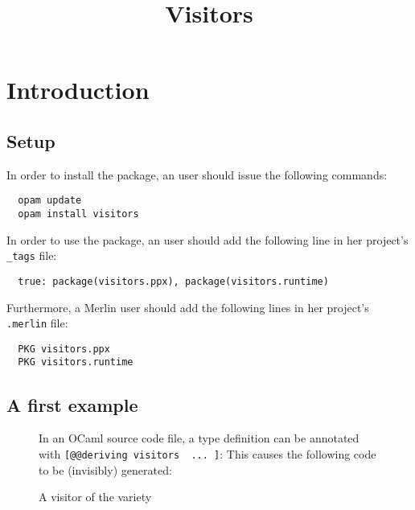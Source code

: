 \documentclass[onecolumn,11pt,nocopyrightspace]{sigplanconf}
\title{Visitors}
\begin{document}
\maketitle


\clearpage


\section{Introduction}

\subsection{Setup}

In order to install the \visitors package, an \opam user should issue the
following commands:
\begin{verbatim}
  opam update
  opam install visitors
\end{verbatim}
In order to use the \visitors package, an \ocamlbuild user should add the
following line in her project's \texttt{\_tags} file:
\begin{lstlisting}
  true: package(visitors.ppx), package(visitors.runtime)
\end{lstlisting}
Furthermore, a Merlin user should add the following lines in her project's
\texttt{.merlin} file:
\begin{lstlisting}
  PKG visitors.ppx
  PKG visitors.runtime
\end{lstlisting}


\subsection{A first example}

\begin{figure}[t]
In an OCaml source code file, a type definition can be annotated with
\texttt{[@@deriving visitors { ... }]}:
This causes the following code to be (invisibly) generated:
\caption{A visitor of the \iter variety}
\label{fig:expr00}
\end{figure}
\end{document}
